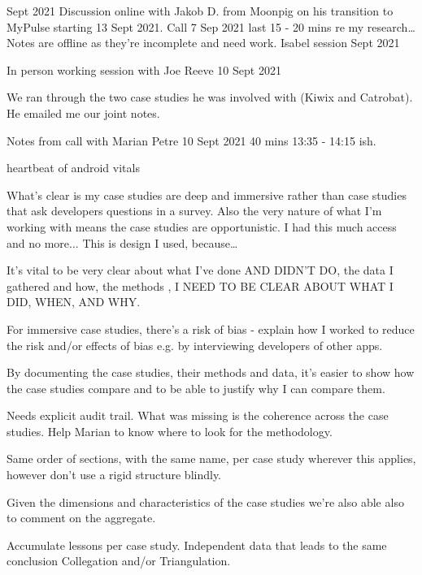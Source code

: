 
\hrulefill
{} Sept 2021
Discussion online with Jakob D. from Moonpig on his transition to MyPulse starting 13 Sept 2021. 
Call 7 Sep 2021 last 15 - 20 mins re my research… Notes are offline as they're incomplete and need work.
\hrulefill
Isabel session  Sept 2021

\hrulefill

In person working session with Joe Reeve 10 Sept 2021

We ran through the two case studies he was involved with (Kiwix and Catrobat). He emailed me our joint notes.

\hrulefill

Notes from call with Marian Petre 10 Sept 2021
40 mins 13:35 - 14:15 ish.
 
heartbeat of android vitals

What's clear is my case studies are deep and immersive rather than case studies that ask developers questions in a survey. Also the very nature of what I'm working with means the case studies are opportunistic. I had this much access and no more... This is design I used, because…

It's vital to be very clear about what I've done AND DIDN’T DO, the data I gathered and how, the methods , I NEED TO BE CLEAR ABOUT WHAT I DID, WHEN, AND WHY.

For immersive case studies, there’s a risk of bias - explain how I worked to reduce the risk and/or effects of bias e.g. by interviewing developers of other apps.

By documenting the case studies, their methods and data, it's easier to show how the case studies compare and to be able to justify why I can compare them.

Needs explicit audit trail. What was missing is the coherence across the case studies. Help Marian to know where to look for the methodology.

Same order of sections, with the same name, per case study wherever this applies, however don't use a rigid structure blindly.

Given the dimensions and characteristics of the case studies we're also able also to comment on the aggregate.


Accumulate lessons per case study.
Independent data that leads to the same conclusion
Collegation and/or Triangulation.

